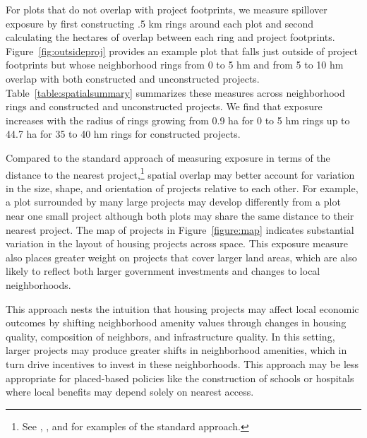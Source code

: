\documentclass[12pt]{article}
\begin{document}
For plots that do not overlap with project footprints, we measure spillover exposure by first constructing .5 km rings around each plot and second calculating the hectares of overlap between each ring and project footprints.  Figure~\ref{fig:outsideproj} provides an example plot that falls just outside of project footprints but whose neighborhood rings from 0 to 5 hm and from 5 to 10 hm overlap with both constructed and unconstructed projects.  Table~\ref{table:spatialsummary} summarizes these measures across neighborhood rings and constructed and unconstructed projects.  We find that exposure increases with the radius of rings growing from 0.9 ha for 0 to 5 hm rings up to 44.7 ha for 35 to 40 hm rings for constructed projects.  

Compared to the standard approach of measuring exposure in terms of the distance to the nearest project,\footnote{See \cite{diamond2016wants}, \cite{rossi2010housing}, and \cite{neumark2015place} for examples of the standard approach.} spatial overlap may better account for variation in the size, shape, and orientation of projects relative to each other.  For example, a plot surrounded by many large projects may develop differently from a plot near one small project although both plots may share the same distance to their nearest project.  The map of projects in Figure~\ref{figure:map} indicates substantial variation in the layout of housing projects across space.  This exposure measure also places greater weight on projects that cover larger land areas, which are also likely to reflect both larger government investments and changes to local neighborhoods.

This approach nests the intuition that housing projects may affect local economic outcomes by shifting neighborhood amenity values through changes in housing quality, composition of neighbors, and infrastructure quality.  In this setting, larger projects may produce greater shifts in neighborhood amenities, which in turn drive incentives to invest in these neighborhoods.  This approach may be less appropriate for placed-based policies like the construction of schools or hospitals where local benefits may depend solely on nearest access.  
\end{document}
